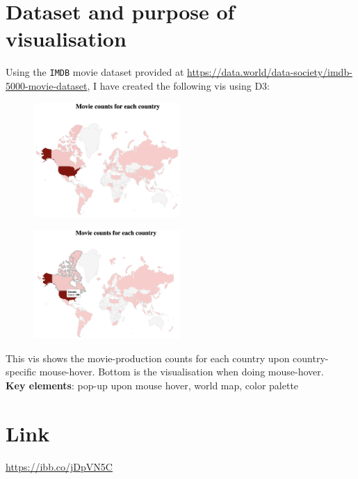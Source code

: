 \newcommand{\forceindent}{\leavevmode{\parindent=1cm\indent}}
\thispagestyle{empty}

\section*{Dataset and purpose of visualisation}
Using the \verb|IMDB| movie dataset provided at \url{https://data.world/data-society/imdb-5000-movie-dataset}, I have created the following vis using D3:

\begin{figure}[H]
	\centering
	\includegraphics[width = 0.5\textwidth]{imgs/worldmap1}
\end{figure}
\begin{figure}[H]
	\centering
	\includegraphics[width = 0.5\textwidth]{imgs/worldmap2}
\end{figure}

This vis shows the movie-production counts for each country upon country-specific mouse-hover. Bottom is the visualisation when doing mouse-hover. \\

\textbf{Key elements}: pop-up upon mouse hover, world map, color palette



\section*{Link}
\url{https://ibb.co/jDpVN5C}
